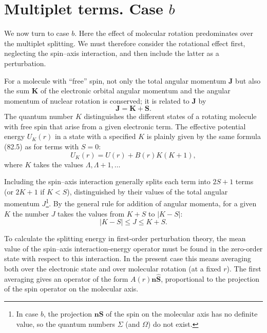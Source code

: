 \section{Multiplet terms. Case $b$}

We now turn to case $b$. Here the effect of molecular rotation predominates over the multiplet splitting. We must therefore consider the rotational effect first, neglecting the spin--axis interaction, and then include the latter as a perturbation.

For a molecule with ``free'' spin, not only the total angular momentum $\mathbf J$ but also the sum $\mathbf K$ of the electronic orbital angular momentum and the angular momentum of nuclear rotation is conserved; it is related to $\mathbf J$ by
\begin{equation}
 \mathbf J=\mathbf K+\mathbf S.
 \tag{84.1}
\end{equation}
The quantum number $K$ distinguishes the different states of a rotating molecule with free spin that arise from a given electronic term. The effective potential energy $U_K(r)$ in a state with a specified $K$ is plainly given by the same formula (82.5) as for terms with $S=0$:
\begin{equation}
 U_K(r)=U(r)+B(r)K(K+1),
 \tag{84.2}
\end{equation}
where $K$ takes the values $\Lambda,\Lambda+1,\ldots$

Including the spin--axis interaction generally splits each term into $2S+1$ terms (or $2K+1$ if $K<S$), distinguished by their values of the total angular momentum $J$\footnote{In case $b$, the projection $\mathbf n\mathbf S$ of the spin on the molecular axis has no definite value, so the quantum numbers $\Sigma$ (and $\Omega$) do not exist.}. By the general rule for addition of angular momenta, for a given $K$ the number $J$ takes the values from $K+S$ to $|K-S|$:
\begin{equation}
 |K-S|\leqslant J\leqslant K+S.
 \tag{84.3}
\end{equation}

To calculate the splitting energy in first-order perturbation theory, the mean value of the spin--axis interaction-energy operator must be found in the zero-order state with respect to this interaction. In the present case this means averaging both over the electronic state and over molecular rotation (at a fixed $r$). The first averaging gives an operator of the form $A(r)\mathbf n\widehat{\mathbf S}$, proportional to the projection of the spin operator on the molecular axis.

